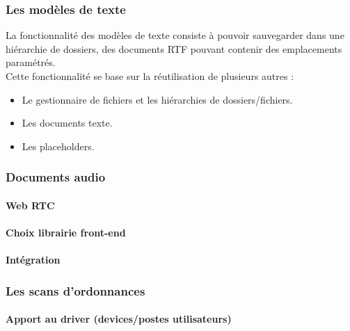
\subsubsection{Les modèles de texte}
La fonctionnalité des modèles de texte consiste à pouvoir sauvegarder dans une hiérarchie de dossiers, des documents RTF pouvant contenir des emplacements paramétrés.\\
Cette fonctionnalité se base sur la réutilisation de plusieurs autres :
\begin{itemize}
\item Le gestionnaire de fichiers et les hiérarchies de dossiers/fichiers.
\item Les documents texte.
\item Les placeholders.
\end{itemize}

\subsubsection{Documents audio}
		\paragraph*{Web RTC}
		\paragraph*{Choix librairie front-end}
		\paragraph*{Intégration}
		
\subsubsection{Les scans d'ordonnances}

\paragraph*{Apport au driver (devices/postes utilisateurs)}

